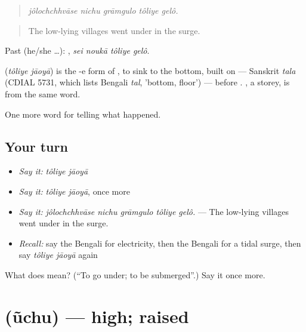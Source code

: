 \begin{quote}
    
\end{quote}

\begin{quote}
\emph{jôlochchhvāse nichu grāmgulo tôliye gelô.}
\end{quote}

\begin{quote}
The low-lying villages went under in the surge.
\end{quote}

Past (he/she …):    , \emph{sei noukā tôliye gelô}.

\begin{cousinweb}
\textbf{ } (\emph{tôliye jāoyā}) is the -e form of , to sink to the bottom, built on  — Sanskrit \emph{tala} (CDIAL 5731, which lists Bengali \emph{tal}, 'bottom, floor') — before \textbf{}. \textbf{}, a storey, is from the same word.
\end{cousinweb}

\begin{grammarlens}[title={What you've built}]
One more word for telling what happened.
\end{grammarlens}

\subsection*{Your turn}
\begin{itemize}
\raggedright
  \item \emph{Say it:} \emph{tôliye jāoyā}
  \item \emph{Say it:} \emph{tôliye jāoyā}, once more
  \item \emph{Say it:} \emph{jôlochchhvāse nichu grāmgulo tôliye gelô.} — The low-lying villages went under in the surge.
  \item \emph{Recall:} say the Bengali for electricity, then the Bengali for a tidal surge, then say \emph{tôliye jāoyā} again
\end{itemize}

\begin{tcolorbox}[breakable,colback=teal!4,colframe=teal!35!black,title={Before you move on}]
What does   mean? (\textquotedblleft{}To go under; to be submerged\textquotedblright{}.) Say it once more.
\end{tcolorbox}
\section[\texorpdfstring{\bn{উঁচু} (ũchu)}{উঁচু (ũchu)}]{ (ũchu) — high; raised}

